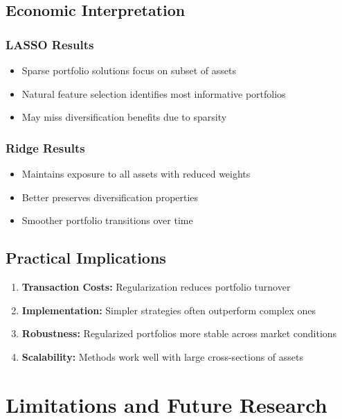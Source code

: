 \documentclass[12pt]{article}
\begin{document}
\subsection{Economic Interpretation}
\subsubsection{LASSO Results}
\begin{itemize}
    \item Sparse portfolio solutions focus on subset of assets
    \item Natural feature selection identifies most informative portfolios
    \item May miss diversification benefits due to sparsity
\end{itemize}

\subsubsection{Ridge Results}
\begin{itemize}
    \item Maintains exposure to all assets with reduced weights
    \item Better preserves diversification properties
    \item Smoother portfolio transitions over time
\end{itemize}

\subsection{Practical Implications}
\begin{enumerate}
    \item \textbf{Transaction Costs:} Regularization reduces portfolio turnover
    \item \textbf{Implementation:} Simpler strategies often outperform complex ones
    \item \textbf{Robustness:} Regularized portfolios more stable across market conditions
    \item \textbf{Scalability:} Methods work well with large cross-sections of assets
\end{enumerate}

\section{Limitations and Future Research}
\end{document}
